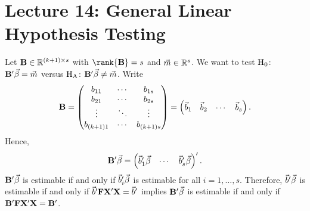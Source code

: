 \section{Lecture 14: General Linear Hypothesis Testing}
Let $ \mathbf{B}\in\mathbb{R}^{(k+1)\times s} $
with $ \rank{\Matrix{B}}=s $ and $ \vec{m}\in\mathbb{R}^s $.
We want to test $ \text{H}_0 $: $ \mathbf{B}'\vec{\beta}=\vec{m} $
versus $ \text{H}_{\text{A}} $: $ \mathbf{B}'\vec{\beta}\ne \vec{m} $. Write
\[ \mathbf{B}=\begin{pmatrix}
        b_{11}     & \cdots & b_{1s}     \\
        b_{21}     & \cdots & b_{2s}     \\
        \vdots     & \ddots & \vdots     \\
        b_{(k+1)1} & \cdots & b_{(k+1)s}
    \end{pmatrix}=\begin{pmatrix}
        \vec{b}_1 & \vec{b}_2 & \cdots & \vec{b}_s
    \end{pmatrix}. \]
Hence,
\[ \mathbf{B}'\vec{\beta}=
    \begin{pmatrix}
        \vec{b}_1' \vec{\beta} & \cdots & \vec{b}_s' \vec{\beta}
    \end{pmatrix}'. \]
$ \mathbf{B}'\vec{\beta} $ is estimable if and only if
$ \vec{b}_i'\vec{\beta} $ is estimable
for all $ i=1,\ldots,s $. Therefore,
$ \vec{b}'\vec{\beta} $ is estimable if and only if $ \vec{b}'\mathbf{F}\mathbf{X}'\mathbf{X}=\vec{b}' $
implies $ \mathbf{B}'\vec{\beta} $ is estimable
if and only if $ \mathbf{B}'\mathbf{F}\mathbf{X}'\mathbf{X}=\mathbf{B}' $.

